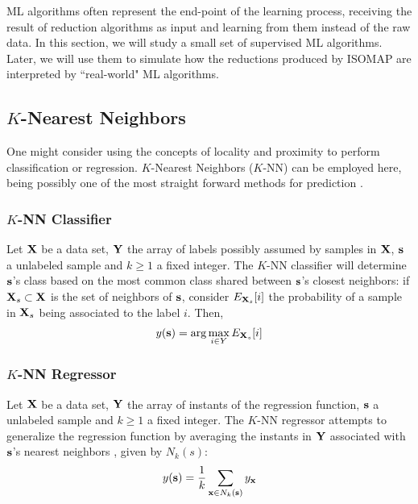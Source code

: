ML algorithms often represent the end-point of the learning process, receiving the result of reduction algorithms as input and learning from them instead of the raw data. In this section, we will study a small set of supervised ML algorithms. Later, we will use them to simulate how the reductions produced by ISOMAP are interpreted by ``real-world" ML algorithms.

\subsection{$K$-Nearest Neighbors}

One might consider using the concepts of locality and proximity to perform classification or regression. $K$-Nearest Neighbors ($K$-NN) can be employed here, being possibly one of the most straight forward methods for prediction \cite{elkan2011nearest}.

\subsubsection{$K$-NN Classifier}

Let $\mathbf{X}$ be a data set, $\mathbf{Y}$ the array of labels possibly assumed by samples in $\mathbf{X}$, $\mathbf{s}$ a unlabeled sample and $k \ge 1$ a fixed integer. The $K$-NN classifier will determine $\mathbf{s}$'s class based on the most common class shared between $\mathbf{s}$'s closest neighbors: if $\mathbf{X}_s \subset \mathbf{X}$ is the set of neighbors of $\mathbf{s}$, consider $E_{\mathbf{X}_s}[i]$ the probability of a sample in $\mathbf{X}_s$ being associated to the label $i$. Then,
\begin{align*}
	y(\mathbf{s}) = \arg \max_{i \in Y} E_{\mathbf{X}_s}[i]
\end{align*}

\subsubsection{$K$-NN Regressor}

Let $\mathbf{X}$ be a data set, $\mathbf{Y}$ the array of instants of the regression function, $\mathbf{s}$ a unlabeled sample and $k \ge 1$ a fixed integer.
The $K$-NN regressor attempts to generalize the regression function by averaging the instants in $\mathbf{Y}$ associated with $\mathbf{s}$'s nearest neighbors \cite{kramer2013dimensionality}, given by $N_k(s)$:	
\begin{align*}
	y(\mathbf{s}) = \frac{1}{k} \sum_{\mathbf{x} \in N_k(\mathbf{s})} y_{\mathbf{x}}
\end{align*}

